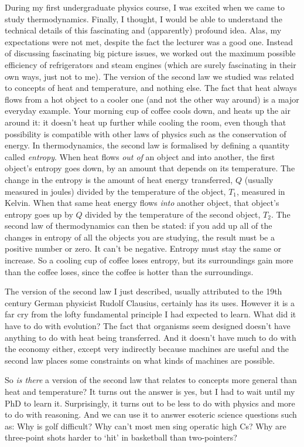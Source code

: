 \documentclass[a4paper, 12pt]{article}
\begin{document}
During my first undergraduate physics course, I was excited when we came to
study thermodynamics. Finally, I thought, I would be able to understand the
technical details of this fascinating and (apparently) profound idea.
Alas, my expectations were not met, despite the fact the lecturer was a
good one.
Instead of discussing fascinating big picture issues, we
worked out the maximum possible efficiency of refrigerators and steam engines
(which are surely fascinating in their own ways, just not to me).
The version of the second law we studied was related to concepts of heat
and temperature, and nothing else.
The fact that heat always flows from a hot object to a cooler
one (and not the other way around) is a major everyday example. Your morning
cup of coffee cools down, and heats up the air around it: it doesn't heat
up further while cooling the room, even though that possibility is compatible
with other laws of physics such as the conservation of energy.
In thermodynamics, the second law is formalised by defining a quantity called
{\em entropy}. When heat flows {\em out of} an object and into another,
the first object's entropy goes
down, by an amount that depends on its temperature.
The change in the entropy is the amount of heat energy transferred,
$Q$ (usually measured in joules)
divided by the temperature of the object, $T_1$, measured in Kelvin.
When that same heat energy flows {\em into} another object, that object's
entropy goes up by $Q$ divided by the temperature of the
second object, $T_2$. The second law of thermodynamics can then be stated: if you
add up all of the changes in entropy of all the objects you are studying,
the result must be a positive number or zero. It can't be negative.
Entropy must stay the same or increase.
So a cooling cup of coffee loses entropy, but its surroundings gain more than
the coffee loses, since the coffee is hotter than the surroundings.

The version of
the second law I just described, usually attributed to the 19th century
German physicist Rudolf Clausius, certainly has its uses. However it is a far
cry from the lofty fundamental principle I had expected to learn. What did it
have to do with evolution? The fact that organisms seem designed doesn't have
anything to do with heat being transferred. And it doesn't have much to do
with the economy either, except very indirectly because machines are useful
and the second law places some constraints on what kinds of machines are
possible.

So {\em is there} a version of the second law that relates to concepts more
general than heat and temperature?
It turns out the answer is yes, but I had to wait until my PhD to learn it.
Surprisingly, it turns out to be less to do with physics and more to do with
reasoning. And we can use it to answer esoteric science questions such as:
Why is golf difficult? Why can't most men sing operatic high Cs?
Why are three-point shots harder to `hit' in basketball than two-pointers?
\end{document}
